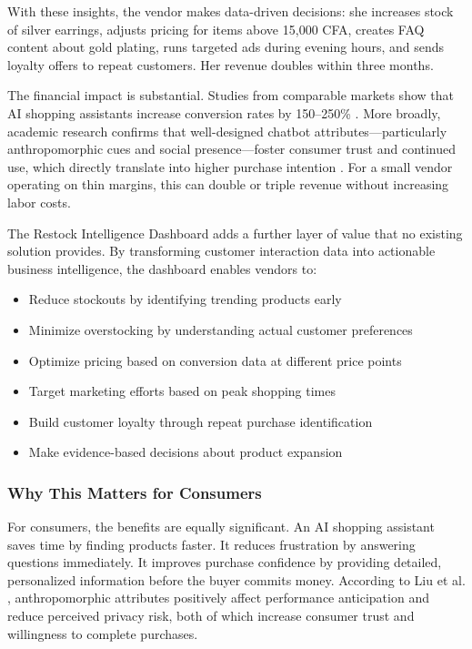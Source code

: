 \documentclass[12pt,a4paper]{article}
\begin{document}
With these insights, the vendor makes data-driven decisions: she increases stock of silver earrings, adjusts pricing for items above 15,000 CFA, creates FAQ content about gold plating, runs targeted ads during evening hours, and sends loyalty offers to repeat customers. Her revenue doubles within three months.

The financial impact is substantial. Studies from comparable markets show that AI shopping assistants increase conversion rates by 150--250\% \citep{gorgias2026}. More broadly, academic research confirms that well-designed chatbot attributes---particularly anthropomorphic cues and social presence---foster consumer trust and continued use, which directly translate into higher purchase intention \citep{liu2026, hamedani2026}. For a small vendor operating on thin margins, this can double or triple revenue without increasing labor costs.

The Restock Intelligence Dashboard adds a further layer of value that no existing solution provides. By transforming customer interaction data into actionable business intelligence, the dashboard enables vendors to:

\begin{itemize}
    \item Reduce stockouts by identifying trending products early
    \item Minimize overstocking by understanding actual customer preferences
    \item Optimize pricing based on conversion data at different price points
    \item Target marketing efforts based on peak shopping times
    \item Build customer loyalty through repeat purchase identification
    \item Make evidence-based decisions about product expansion
\end{itemize}

\subsubsection{Why This Matters for Consumers}

For consumers, the benefits are equally significant. An AI shopping assistant saves time by finding products faster. It reduces frustration by answering questions immediately. It improves purchase confidence by providing detailed, personalized information before the buyer commits money. According to Liu et al. \citep{liu2026}, anthropomorphic attributes positively affect performance anticipation and reduce perceived privacy risk, both of which increase consumer trust and willingness to complete purchases.
\end{document}
